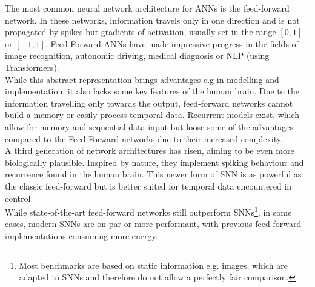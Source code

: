 The most common neural network architecture for \acp{ANN} is the feed-forward network.
In these networks, information travels only in one direction and is not propagated by spikes but gradients of activation, usually set in the range $[0,1]$ or $[-1,1]$.
Feed-Forward \acp{ANN} have made impressive progress in the fields of image recognition, autonomic driving, medical diagnosis\cite{patel_applications_2007} or  \ac{NLP} (using Transformers\cite{vaswani_attention_2017}).\\
While this abstract representation brings advantages e.g in modelling and implementation, it also lacks some key features of the human brain. Due to the information travelling only towards the output, feed-forward networks cannot build a memory or easily process temporal data. Recurrent models exist, which allow for memory \cite{hutchison_biologically_2004} and sequential data input but loose some of the advantages compared to the Feed-Forward networks due to their increased complexity.\\
A third generation\cite{maass_networks_1997} of network architectures has risen, aiming to be even more biologically plausible. Inspired by nature, they implement spiking behaviour and recurrence found in the human brain.
This newer form of \ac{SNN} is as powerful as the classic feed-forward but is better suited for temporal data encountered in control.\\
While state-of-the-art feed-forward networks still outperform \acp{SNN}\footnote{Most benchmarks are based on static information e.g. images, which are adapted to \acp{SNN} and therefore do not allow a perfectly fair comparison.}, in some cases, modern \acp{SNN} are on par\cite{lee_training_2016} or more performant, with previous feed-forward implementations consuming more energy.

%

